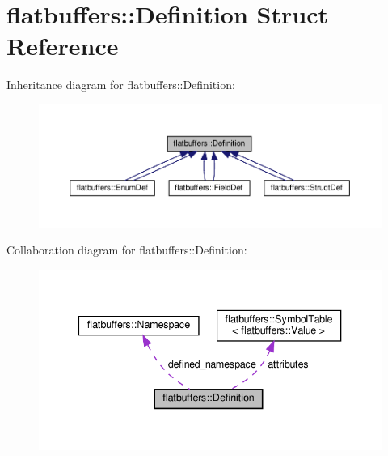\hypertarget{structflatbuffers_1_1Definition}{}\section{flatbuffers\+:\+:Definition Struct Reference}
\label{structflatbuffers_1_1Definition}


Inheritance diagram for flatbuffers\+:\+:Definition\+:
\nopagebreak
\begin{figure}[H]
\begin{center}
\leavevmode
\includegraphics[width=350pt]{structflatbuffers_1_1Definition__inherit__graph}
\end{center}
\end{figure}


Collaboration diagram for flatbuffers\+:\+:Definition\+:
\nopagebreak
\begin{figure}[H]
\begin{center}
\leavevmode
\includegraphics[width=340pt]{structflatbuffers_1_1Definition__coll__graph}
\end{center}
\end{figure}

